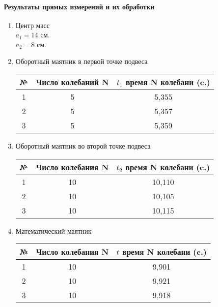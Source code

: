 \documentclass{article}
\begin{document}
\paragraph{Результаты прямых измерений и их обработки }
\begin{enumerate}
	\item Центр масс\\
	$ a_1 = 14 $ см.\\
	$ a_2 = 8$ см.
\item Оборотный маятник в первой точке подвеса

\begin{table}[h]	
\begin{tabular}{|c|c|c|}
	\hline
	№ & Число колебаний N & $t_1$  время N колебани (c.) \\
	\hline
	1 & 5 & 5,355 \\
	\hline
	2 & 5 & 5,357 \\
	\hline
	3 & 5 & 5,359 \\
	\hline
\end{tabular}
\end{table}

\item Оборотный маятник во второй точке подвеса

\begin{table}[!h]
\begin{tabular}{|c|c|c|}
		\hline
		№ & Число колебания N & $t_2$  время N колебани (c.) \\
		\hline
		1 & 10 & 10,110 \\
		\hline
		2 & 10 & 10,105 \\
		\hline
		3 & 10 & 10,115 \\
		\hline
\end{tabular}
\end{table}

\item Математический маятник

\begin{table}[!hpb]
	\begin{tabular}{|c|c|c|}
		\hline
		№ & Число колебания N & $t$  время N колебани (c.) \\
		\hline
		1 & 10 &  9,901\\
		\hline
		2 & 10 & 9,921 \\
		\hline
		3 & 10 & 9,918 \\
		\hline
	\end{tabular}
\end{table}
\end{enumerate}
\end{document}
